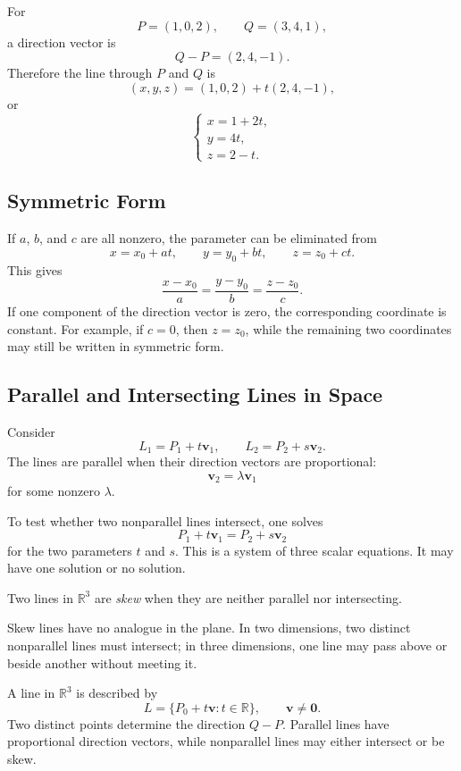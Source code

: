 \begin{examplebox}
For
\[
P=(1,0,2),
\qquad
Q=(3,4,1),
\]
a direction vector is
\[
Q-P=(2,4,-1).
\]
Therefore the line through $P$ and $Q$ is
\[
(x,y,z)=(1,0,2)+t(2,4,-1),
\]
or
\[
\begin{cases}
x=1+2t,\\
y=4t,\\
z=2-t.
\end{cases}
\]
\end{examplebox}

\subsection{Symmetric Form}

If $a$, $b$, and $c$ are all nonzero, the parameter can be eliminated from
\[
x=x_0+at,
\qquad
y=y_0+bt,
\qquad z=z_0+ct.
\]
This gives
\[
\frac{x-x_0}{a}
=
\frac{y-y_0}{b}
=
\frac{z-z_0}{c}.
\]
If one component of the direction vector is zero, the corresponding coordinate
is constant. For example, if $c=0$, then $z=z_0$, while the remaining two
coordinates may still be written in symmetric form.

\subsection{Parallel and Intersecting Lines in Space}

Consider
\[
L_1=P_1+t\mathbf v_1,
\qquad
L_2=P_2+s\mathbf v_2.
\]
The lines are parallel when their direction vectors are proportional:
\[
\mathbf v_2=\lambda\mathbf v_1
\]
for some nonzero $\lambda$.

To test whether two nonparallel lines intersect, one solves
\[
P_1+t\mathbf v_1=P_2+s\mathbf v_2
\]
for the two parameters $t$ and $s$. This is a system of three scalar equations.
It may have one solution or no solution.

\begin{definitionbox}
Two lines in $\mathbb{R}^3$ are \emph{skew} when they are neither parallel nor
intersecting.
\end{definitionbox}

Skew lines have no analogue in the plane. In two dimensions, two distinct
nonparallel lines must intersect; in three dimensions, one line may pass above
or beside another without meeting it.

\begin{summarybox}
A line in $\mathbb{R}^3$ is described by
\[
L=\{P_0+t\mathbf v:t\in\mathbb{R}\},
\qquad \mathbf v\neq\mathbf 0.
\]
Two distinct points determine the direction $Q-P$. Parallel lines have
proportional direction vectors, while nonparallel lines may either intersect or
be skew.
\end{summarybox}